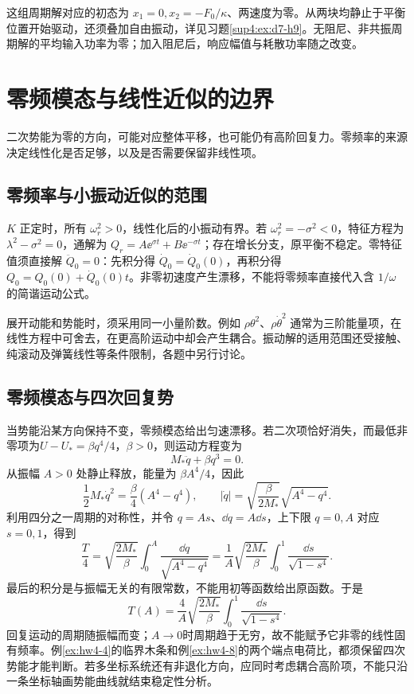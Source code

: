 \begin{solution}
这组周期解对应的初态为 $x_1=0,x_2=-F_0/\kappa$、两速度为零。从两块均静止于平衡位置开始驱动，还须叠加自由振动，详见习题\ref{sup4:ex:d7-h9}。无阻尼、非共振周期解的平均输入功率为零；加入阻尼后，响应幅值与耗散功率随之改变。
\end{solution}



\section{零频模态与线性近似的边界}

二次势能为零的方向，可能对应整体平移，也可能仍有高阶回复力。零频率的来源决定线性化是否足够，以及是否需要保留非线性项。



\subsection{零频率与小振动近似的范围}
$K$ 正定时，所有 $\omega_r^2>0$，线性化后的小振动有界。若 $\omega_r^2=-\sigma^2<0$，特征方程为 $\lambda^2-\sigma^2=0$，通解为 $Q_r=A\ee^{\sigma t}+B\ee^{-\sigma t}$；存在增长分支，原平衡不稳定。零特征值须直接解 $\ddot Q_0=0$：先积分得 $\dot Q_0=\dot Q_0(0)$，再积分得 $Q_0=Q_0(0)+\dot Q_0(0)t$。非零初速度产生漂移，不能将零频率直接代入含 $1/\omega$ 的简谐运动公式。

展开动能和势能时，须采用同一小量阶数。例如 $\rho\theta^2$、$\rho\dot\theta^2$ 通常为三阶能量项，在线性方程中可舍去，在更高阶运动中却会产生耦合。振动解的适用范围还受接触、纯滚动及弹簧线性等条件限制，各题中另行讨论。


\subsection{零频模态与四次回复势}
当势能沿某方向保持不变，零频模态给出匀速漂移。若二次项恰好消失，而最低非零项为$U-U_* =\beta q^4/4$，$\beta>0$，则运动方程变为
\[
 M_*\ddot q+\beta q^3=0.
\]
从振幅 $A>0$ 处静止释放，能量为 $\beta A^4/4$，因此
\[
\frac12M_*\dot q^2=\frac\beta4(A^4-q^4),\qquad
|\dot q|=\sqrt{\frac\beta{2M_*}}\sqrt{A^4-q^4}.
\]
利用四分之一周期的对称性，并令 $q=As$、$\dd q=A\dd s$，上下限 $q=0,A$ 对应 $s=0,1$，得到
\[
\frac T4=\sqrt{\frac{2M_*}\beta}\int_0^A\frac{\dd q}{\sqrt{A^4-q^4}}
=\frac1A\sqrt{\frac{2M_*}\beta}\int_0^1\frac{\dd s}{\sqrt{1-s^4}}.
\]
最后的积分是与振幅无关的有限常数，不能用初等函数给出原函数。于是
\[
 T(A)=\frac4A\sqrt{\frac{2M_*}{\beta}}
 \int_0^1\frac{\dd s}{\sqrt{1-s^4}}.
\]
回复运动的周期随振幅而变；$A\to0$时周期趋于无穷，故不能赋予它非零的线性固有频率。例\ref{ex:hw4-4}的临界木条和例\ref{ex:hw4-8}的两个端点电荷比，都须保留四次势能才能判断。若多坐标系统还有非退化方向，应同时考虑耦合高阶项，不能只沿一条坐标轴画势能曲线就结束稳定性分析。



